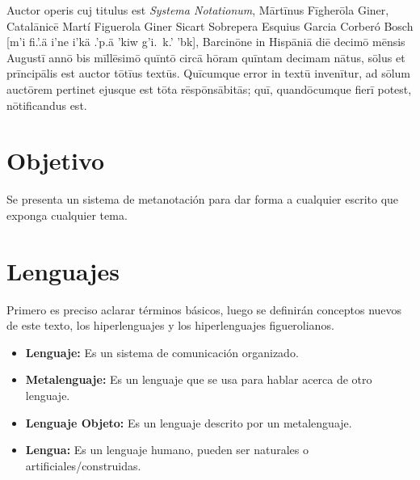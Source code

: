 \documentclass[12pt]{report}
\newcommand{\titlename}{Systema Notationum}
\begin{document}
	
	
	
	Auctor operis cuj titulus est \textit{\titlename}, Mārtīnus Fīgherōla Giner, Catalānicē Martí Figuerola Giner Sicart Sobrepera Esquius Garcia Corberó Bosch [m\textturna\textfishhookr'i fi.\textlowering{\textgamma}'\textfishhookr{}.\textltilde ä \textyogh i'ne i'kä\textfishhookr{} .\textlowering{\textbeta}\textfishhookr {}'p.\textfishhookr ä \textturna {}'kiw g\textturna\textfishhookr'i.\textturna\ k\textfishhookr.\textlowering{\textbeta}'\textfishhookr{} 'b\textopeno {}k], Barcinōne in Hispāniā diē decimō mēnsis Augustī annō bis mīllēsimō quīntō circā hōram quīntam decimam nātus, sōlus et prīncipālis est auctor tōtīus textūs. Quīcumque error in textū invenītur, ad sōlum auctōrem pertinet ejusque est tōta rēspōnsābitās; quī, quandōcumque fierī potest, nōtificandus est.
	
	\addtoc
	
	
	
	\section{Objetivo}
	Se presenta un sistema de metanotación para dar forma a cualquier escrito que exponga cualquier tema.
	
	\section{Lenguajes}

	
	
	
	Primero es preciso aclarar términos básicos, luego se definirán conceptos nuevos de este texto, los hiperlenguajes y los hiperlenguajes figuerolianos.
	
	\begin{minibloque}[Definiciones]
		\begin{itemize}
			\item \textbf{Lenguaje: }Es un sistema de comunicación organizado.
			\item \textbf{Metalenguaje: }Es un lenguaje que se usa para hablar acerca de otro lenguaje.
			\item \textbf{Lenguaje Objeto: }Es un lenguaje descrito por un metalenguaje.
			\item \textbf{Lengua: }Es un lenguaje humano, pueden ser naturales o artificiales/construidas.
		\end{itemize}
	\end{minibloque}
	
\end{document}
